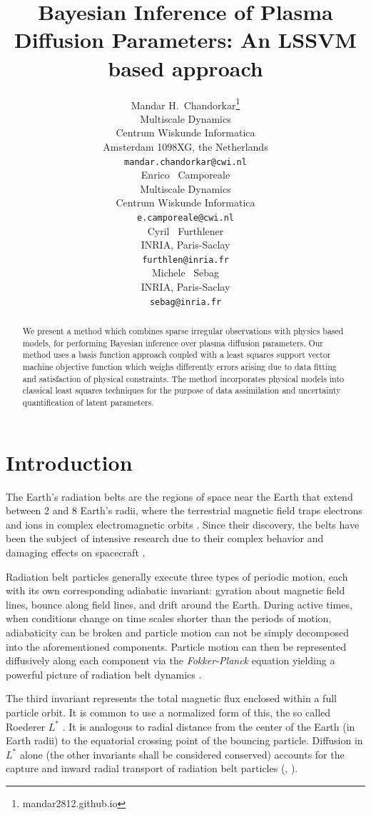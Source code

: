 \documentclass{article}
\title{Bayesian Inference of Plasma Diffusion Parameters: An LSSVM based approach}
\author{
  Mandar H.~Chandorkar\thanks{mandar2812.github.io} \\
  Multiscale Dynamics\\
  Centrum Wiskunde Informatica\\
  Amsterdam 1098XG, the Netherlands\\
  \texttt{mandar.chandorkar@cwi.nl} \\
   \And
   Enrico ~Camporeale \\
   Multiscale Dynamics \\
   Centrum Wiskunde Informatica \\
   \texttt{e.camporeale@cwi.nl} \\
   \AND
   Cyril ~Furthlener \\
   INRIA, Paris-Saclay \\
   \texttt{furthlen@inria.fr} \\
   \And
   Michele ~Sebag \\
   INRIA, Paris-Saclay \\
   \texttt{sebag@inria.fr} \\
}
\begin{document}

\maketitle

\begin{abstract}
 We present a method which combines sparse irregular observations with physics based models, 
 for performing Bayesian inference over plasma diffusion parameters. Our method uses a basis
 function approach coupled with a least squares support vector machine objective function which
 weighs differently errors arising due to data fitting and satisfaction of physical constraints.
 The method incorporates physical models into classical least squares techniques for the purpose
 of data assimilation and uncertainty quantification of latent parameters.
\end{abstract}

\section{Introduction}

The Earth's radiation belts are the regions of space near 
the Earth that extend between 2 and 8 Earth's radii, where the terrestrial magnetic field traps 
electrons and ions in complex electromagnetic orbits  \citep{vanAllen}. Since their discovery,
the belts have been the subject of intensive research due to their complex behavior
and damaging effects on spacecraft \citep{GUBBY20021723, WellingSatellite, baker2002}.

Radiation belt particles generally execute three types of periodic motion, 
each with its own corresponding adiabatic invariant: 
gyration about magnetic field lines, bounce along field lines, 
and drift around the Earth. During active times, when conditions 
change on time scales shorter than the periods of motion, 
adiabaticity can be broken and particle motion can not be
simply decomposed into the aforementioned components. Particle motion 
can then be represented diffusively along each component via the 
\emph{Fokker-Planck} equation yielding a powerful picture of 
radiation belt dynamics \citep{schulz2012particle}.

The third invariant represents the total magnetic flux enclosed within 
a full particle orbit. It is common to use a normalized form of this, the 
so called Roederer $L^{*}$ \citep{Roederer1970}. It is analogous to radial 
distance from the center of the Earth (in Earth radii) to the equatorial 
crossing point of the bouncing particle. Diffusion in $L^{*}$ alone 
(the other invariants shall be considered conserved) accounts for the
capture and inward radial transport of radiation belt particles 
(\cite{Roederer1970}, \citep{JGR:JGR4463}).
\end{document}
